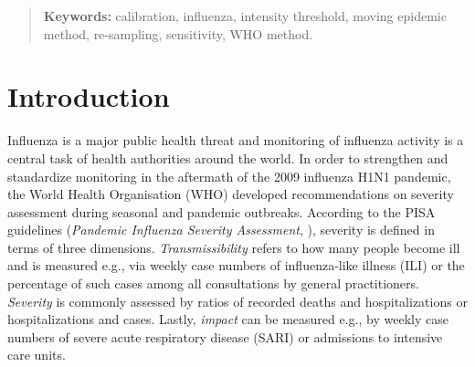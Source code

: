 \documentclass[12pt]{article}
\begin{document}
\bigskip

\begin{quote}
\textbf{Keywords:} calibration, influenza, intensity threshold, moving epidemic method, re-sampling, sensitivity, WHO method.
\end{quote}

\newpage

%




\section{Introduction}
\label{sec:introduction}

Influenza is a major public health threat and monitoring of influenza activity is a central task of health authorities around the world. In order to strengthen and standardize monitoring in the aftermath of the 2009 influenza H1N1 pandemic, the World Health Organisation (WHO) developed recommendations on severity assessment during seasonal and pandemic outbreaks. According to the PISA guidelines (\textit{Pandemic Influenza Severity Assessment}, \citealt{WHO2014}), severity is defined in terms of three dimensions. \textit{Transmissibility} refers to how many people become ill and is measured e.g., via weekly case numbers of influenza-like illness (ILI) or the percentage of such cases among all consultations by general practitioners. \textit{Severity} is commonly assessed by ratios of recorded deaths and hospitalizations or hospitalizations and cases. Lastly, \textit{impact} can be measured e.g., by weekly case numbers of severe acute respiratory disease (SARI) or admissions to intensive care units.
\end{document}

